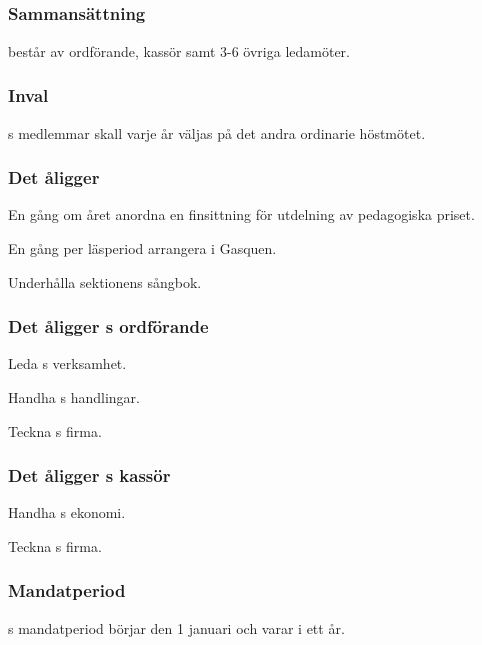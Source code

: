 \subsection{\SEXITFULL}
\subsubsection{Sammansättning}
\SEXIT{} består av ordförande, kassör samt 3-6 övriga ledamöter.

\subsubsection{Inval}
\SEXIT{}s medlemmar skall varje år väljas på det andra ordinarie höstmötet.

\subsubsection{Det åligger \SEXIT}
\begin{att}
	\item En gång om året anordna en finsittning för utdelning av pedagogiska priset.
	\item En gång per läsperiod arrangera i Gasquen.
	\item Underhålla sektionens sångbok. 
\end{att}

\subsubsection{Det åligger \SEXIT{}s ordförande}
\begin{att}
	\item Leda \SEXIT{}s verksamhet.
	\item Handha \SEXIT{}s handlingar.
	\item Teckna \SEXIT{}s firma.
\end{att}

\subsubsection{Det åligger \SEXIT{}s kassör}
\begin{att}
	\item Handha \SEXIT{}s ekonomi.
	\item Teckna \SEXIT{}s firma.
\end{att}

\subsubsection{Mandatperiod}
\SEXIT{}s mandatperiod börjar den 1 januari och varar i ett år.